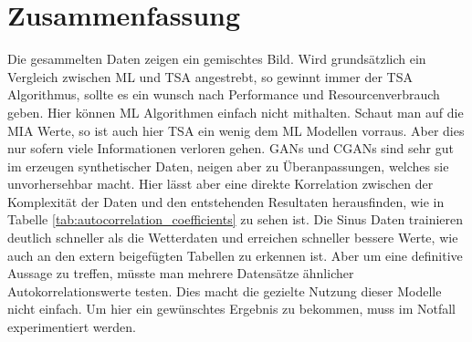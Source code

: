 \section{Zusammenfassung}
Die gesammelten Daten zeigen ein gemischtes Bild. Wird grundsätzlich ein Vergleich zwischen \ac{ML} und \ac{TSA} angestrebt, so gewinnt immer der TSA Algorithmus, sollte es ein wunsch nach Performance und Resourcenverbrauch geben.
Hier können \ac{ML} Algorithmen einfach nicht mithalten.
Schaut man auf die \ac{MIA} Werte, so ist auch hier \ac{TSA} ein wenig dem \ac{ML} Modellen vorraus. Aber dies nur sofern viele Informationen verloren gehen.
GANs und CGANs sind sehr gut im erzeugen synthetischer Daten, neigen aber zu Überanpassungen, welches sie unvorhersehbar macht. Hier lässt aber eine direkte Korrelation zwischen der Komplexität der Daten und den entstehenden Resultaten herausfinden, wie in 
Tabelle \ref{tab:autocorrelation_coefficients} zu sehen ist. Die Sinus Daten trainieren deutlich schneller als die Wetterdaten und erreichen schneller bessere Werte, wie auch an den extern beigefügten Tabellen zu erkennen ist. Aber um eine definitive Aussage zu treffen, müsste man mehrere Datensätze ähnlicher Autokorrelationswerte testen.
Dies macht die gezielte Nutzung dieser Modelle nicht einfach. Um hier ein gewünschtes Ergebnis zu bekommen, muss im Notfall experimentiert werden.


